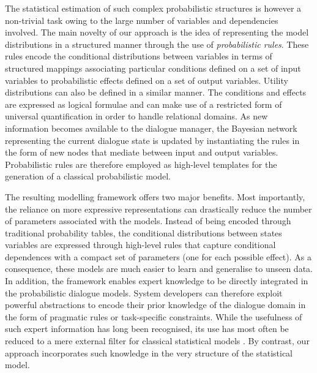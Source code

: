 The statistical estimation of such complex probabilistic structures is however a non-trivial task owing to the large number of variables and dependencies involved. The main novelty of our approach is the idea of representing the model distributions in a structured manner through the use of \textit{probabilistic rules}.  These rules encode the conditional distributions between variables in terms of structured mappings associating particular conditions defined on a set of input variables to probabilistic effects defined on a set of output variables.  Utility distributions can also be defined in a similar manner.  The conditions and effects are expressed as logical formulae and can make use of a restricted form of universal quantification in order to handle relational domains.
As new information becomes available to the dialogue manager, the Bayesian network representing the current dialogue state is updated by instantiating the rules in the form of new nodes that mediate between input and output variables. Probabilistic rules are therefore employed as high-level templates for the generation of a classical probabilistic model. 

The resulting modelling framework offers two major benefits. Most importantly, the reliance on more expressive representations can drastically reduce the number of parameters associated with the models.  Instead of being encoded through traditional probability tables, the conditional distributions between states variables are expressed through high-level rules that capture conditional dependences with a compact set of parameters (one for each possible effect). As a consequence, these models are much easier to learn and generalise to unseen data.  In addition, the framework enables expert knowledge to be directly integrated in the probabilistic dialogue models. System developers can therefore exploit powerful abstractions to encode their prior knowledge of the dialogue domain in the form of pragmatic rules or task-specific constraints.    
While the usefulness of such expert information has long been recognised, its use has most often be reduced to a mere external filter for classical statistical models \citep{heeman2007,williams2008}. By contrast, our approach incorporates such knowledge in the very structure of the statistical model.

